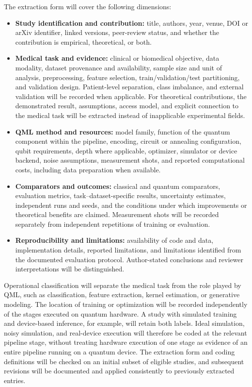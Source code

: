 \documentclass[pdflatex,bst/sn-mathphys-num]{sn-jnl}
\begin{document}
The extraction form will cover the following dimensions:
\begin{itemize}
    \item \textbf{Study identification and contribution:} title, authors, year, venue, DOI or arXiv identifier, linked versions, peer-review status, and whether the contribution is empirical, theoretical, or both.
    \item \textbf{Medical task and evidence:} clinical or biomedical objective, data modality, dataset provenance and availability, sample size and unit of analysis, preprocessing, feature selection, train/validation/test partitioning, and validation design. Patient-level separation, class imbalance, and external validation will be recorded when applicable. For theoretical contributions, the demonstrated result, assumptions, access model, and explicit connection to the medical task will be extracted instead of inapplicable experimental fields.
    \item \textbf{QML method and resources:} model family, function of the quantum component within the pipeline, encoding, circuit or annealing configuration, qubit requirements, depth where applicable, optimizer, simulator or device backend, noise assumptions, measurement shots, and reported computational costs, including data preparation when available.
    \item \textbf{Comparators and outcomes:} classical and quantum comparators, evaluation metrics, task--dataset-specific results, uncertainty estimates, independent runs and seeds, and the conditions under which improvements or theoretical benefits are claimed. Measurement shots will be recorded separately from independent repetitions of training or evaluation.
    \item \textbf{Reproducibility and limitations:} availability of code and data, implementation details, reported limitations, and limitations identified from the documented evaluation protocol. Author-stated conclusions and reviewer interpretations will be distinguished.
\end{itemize}

Operational classification will separate the medical task from the role played by QML, such as classification, feature extraction, kernel estimation, or generative modeling. The location of training or optimization will be recorded independently of the stages executed on quantum hardware. A study with simulated training and device-based inference, for example, will retain both labels. Ideal simulation, noisy simulation, and real-device execution will therefore be coded at the relevant pipeline stage, without treating hardware execution of one stage as evidence of an entire pipeline running on a quantum device. The extraction form and coding definitions will be checked on an initial subset of eligible studies, and subsequent revisions will be documented and applied consistently to previously extracted entries.
\end{document}
